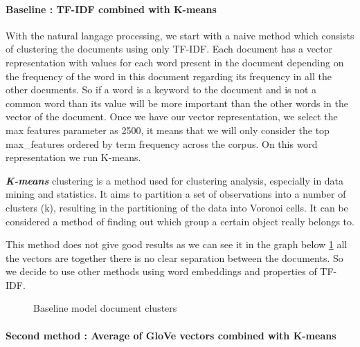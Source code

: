 \documentclass[article,twocolumn]{IEEEtran}
\begin{document}
\hypertarget{baseline-tf-idf-combined-with-k-means}{%
\paragraph{Baseline : TF-IDF combined with
K-means}\label{baseline-tf-idf-combined-with-k-means}}

With the natural langage processing, we start with a naive method which
consists of clustering the documents using only TF-IDF. Each document
has a vector representation with values for each word present in the
document depending on the frequency of the word in this document
regarding its frequency in all the other documents. So if a word is a
keyword to the document and is not a common word than its value will be
more important than the other words in the vector of the document. Once
we have our vector representation, we select the max features parameter
as 2500, it means that we will only consider the top max\_features
ordered by term frequency across the corpus. On this word representation
we run K-means.

\textbf{\emph{K-means}} clustering is a method used for clustering
analysis, especially in data mining and statistics. It aims to partition
a set of observations into a number of clusters (k), resulting in the
partitioning of the data into Voronoi cells. It can be considered a
method of finding out which group a certain object really belongs to.

This method does not give good results as we can see it in the graph
below \ref{fig3} all the vectors are together there is no clear
separation between the documents. So we decide to use other methods
using word embeddings and properties of TF-IDF.


    \begin{figure}
        \begin{center}\end{center}
        \caption{Baseline model document clusters}
        \label{fig3}
    \end{figure}
    
    \hypertarget{second-method-average-of-glove-vectors-combined-with-k-means}{%
\paragraph{Second method : Average of GloVe vectors combined with
K-means}\label{second-method-average-of-glove-vectors-combined-with-k-means}}
\end{document}
